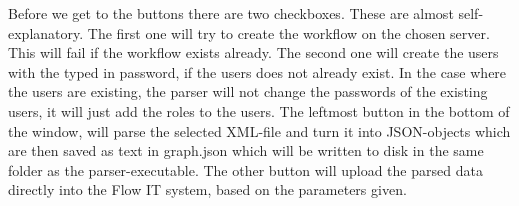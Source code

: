 Before we get to the buttons there are two checkboxes. These are almost self-explanatory. The first one will try to create the workflow on the chosen server. This will fail if the workflow exists already. \newline
The second one will create the users with the typed in password, if the users does not already exist. In the case where the users are existing, the parser will not change the passwords of the existing users, it will just add the roles to the users. \newline
The leftmost button in the bottom of the window, will parse the selected XML-file and turn it into JSON-objects which are then saved as text in graph.json which will be written to disk in the same folder as the parser-executable. \newline
The other button will upload the parsed data directly into the Flow IT system, based on the parameters given.